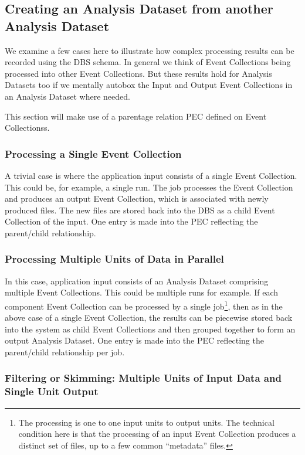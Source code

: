 \documentclass[pdftex]{cmspaper}
\begin{document}
{\subsection{Creating an Analysis Dataset from another Analysis Dataset}
\label{sec:createEvColl}

We examine a few cases here to illustrate how complex processing results
can be recorded using the DBS schema.  In general we think of Event
Collections being processed into other Event Collections.  But these
results hold for Analysis Datasets too if we mentally autobox the Input
and Output Event Collections in an Analysis Dataset where needed.

This section will make use of a parentage relation PEC defined on Event
Collectionss.

\subsubsection{Processing a Single Event Collection}

A trivial case is where the application input consists of a single
Event Collection.  This could be, for example, a single run.  The job
processes the Event Collection and produces an output Event Collection,
which is associated with newly produced files.  The new files are stored
back into the DBS as a child Event Collection of the input.  One entry
is made into the PEC reflecting the parent/child relationship.

\subsubsection{Processing Multiple Units of Data in Parallel}

In this case, application input consists of an Analysis Dataset
comprising multiple Event Collections. This could be multiple runs
for example.  If each component Event Collection can be processed
by a single job\footnote{The processing is one to one input units to
output units.  The technical condition here is that the processing of
an input Event Collection produces a distinct set of files, up to a
few common ``metadata'' files.}, then as in the above case of a single
Event Collection, the results can be piecewise stored back into the
system as child Event Collections and then grouped together to form an
output Analysis Dataset.  One entry is made into the PEC reflecting the
parent/child relationship per job.

\subsubsection{Filtering or Skimming: Multiple Units of Input Data and Single 
Unit Output}

}
\end{document}
